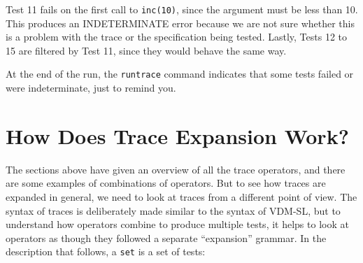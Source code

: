 \documentclass{overturerepchap}
\begin{document}
Test 11 fails on the first call to \texttt{inc(10)}, since the argument must be
less than 10. This produces an INDETERMINATE error because we are not
sure whether this is a problem with the trace or the specification being tested.
Lastly, Tests 12 to 15 are filtered by Test 11, since they would behave the same
way.

At the end of the run, the \texttt{runtrace} command indicates that some tests
failed or were indeterminate, just to remind you.

\section{How Does Trace Expansion Work?}

The sections above have given an overview of all the trace operators, and there
are some examples of combinations of operators. But to see how traces are
expanded in general, we need to look at traces from a different point of view.
The syntax of traces is deliberately made similar to the syntax of VDM-SL, but
to understand how operators combine to produce multiple tests, it helps to look
at operators as though they followed a separate ``expansion'' grammar. In the
description that follows, a \texttt{set} is a set of tests:
\end{document}
